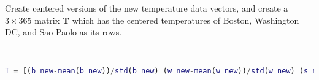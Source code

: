 Create centered versions of the new temperature data vectors, and create a $3 \times 365$ matrix $\boldsymbol{T}$ which has the centered temperatures of Boston, Washington DC, and Sao Paolo as its rows.

\begin{solution} \
    \begin{lstlisting}[language=Matlab]
T = [(b_new-mean(b_new))/std(b_new) (w_new-mean(w_new))/std(w_new) (s_new-mean(s_new))/std(s_new)]'
    \end{lstlisting}
\end{solution}